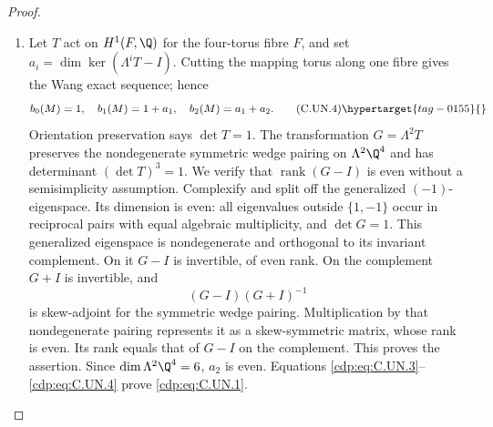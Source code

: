 \begin{proof}
\begin{enumerate}[label={$\langle1\rangle$\arabic*.},leftmargin=*]
\item Let $T$ act on $H^1(F,\Q)$ for the four-torus fibre $F$, and set
$a_i=\dim\ker(\Lambda^iT-I)$. Cutting the mapping torus along one
fibre gives the Wang exact sequence; hence
\[
 b_0(M)=1,\quad b_1(M)=1+a_1,\quad b_2(M)=a_1+a_2.
                                                        \tag{C.UN.4}\hypertarget{tag-0155}{}\label{cdp:eq:C.UN.4}
\]
Orientation preservation says $\det T=1$. The transformation
$G=\Lambda^2T$ preserves the nondegenerate symmetric wedge pairing
on $\Lambda^2\Q^4$ and has determinant $(\det T)^3=1$.
We verify that $\operatorname{rank}(G-I)$ is even without a
semisimplicity assumption. Complexify and split off the generalized
$(-1)$-eigenspace. Its dimension is even: all eigenvalues outside
$\{1,-1\}$ occur in reciprocal pairs with equal algebraic
multiplicity, and $\det G=1$. This generalized eigenspace is
nondegenerate and orthogonal to its invariant complement. On it
$G-I$ is invertible, of even rank. On the complement $G+I$ is
invertible, and
\[
                         (G-I)(G+I)^{-1}
\]
is skew-adjoint for the symmetric wedge pairing. Multiplication by
that nondegenerate pairing represents it as a skew-symmetric matrix,
whose rank is even. Its rank equals that of $G-I$ on the complement.
This proves the assertion. Since $\dim\Lambda^2\Q^4=6$, $a_2$ is
even. Equations \eqref{cdp:eq:C.UN.3}--\eqref{cdp:eq:C.UN.4} prove \eqref{cdp:eq:C.UN.1}.

\end{enumerate}
\end{proof}